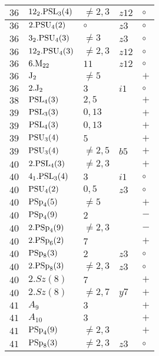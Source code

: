 \documentclass[a4paper, 11pt]{article}
\begin{document}
\begin{longtable}{lllll}
		$36$ & $12_2.{\rm PSL}_{3}(4)$ & $\neq 2,3$ & $z12$ & $\circ$ \\ \hline
		$36$ & $2.{\rm PSU}_{4}(2)$ & $\circ$ & $z3$ & $\circ$ \\ \hline
		$36$ & $3_2.{\rm PSU}_{4}(3)$ & $\neq 3$ & $z3$ & $\circ$ \\ \hline
		$36$ & $12_2.{\rm PSU}_{4}(3)$ & $\neq 2,3$ & $z12$ & $\circ$ \\ \hline
		$36$ & $6.{\rm M}_{22}$ & $11$ & $z12$ & $\circ$ \\ \hline
		$36$ & ${\rm J}_2$ & $\neq 5$ & & $+$ \\ \hline
		$36$ & $2.{\rm J}_2$ & $3$ & $i1$ & $\circ$ \\ \hline
		$38$ & ${\rm PSL}_{4}(3)$ & $2,5$ & & $+$ \\ \hline
		$39$ & ${\rm PSL}_{3}(3)$ & $0,13$ & & $+$ \\ \hline
		$39$ & ${\rm PSL}_{4}(3)$ & $0,13$ & & $+$ \\ \hline
		$39$ & ${\rm PSU}_{3}(4)$ & $5$ & & $+$ \\ \hline
		$39$ & ${\rm PSU}_{3}(4)$ & $\neq 2,5$ & $b5$ & $+$ \\ \hline
		$40$ & $2.{\rm PSL}_{4}(3)$ & $\neq 2,3$ & & $+$ \\ \hline
		$40$ & $4_1.{\rm PSL}_{3}(4)$ & $3$ & $i1$ & $\circ$ \\ \hline
		$40$ & ${\rm PSU}_{4}(2)$ & $0,5$ & $z3$ & $\circ$ \\ \hline
		$40$ & ${\rm PSp}_{4}(5)$ & $\neq 5$ & & $+$ \\ \hline
		$40$ & ${\rm PSp}_{4}(9)$ & $2$ & & $-$ \\ \hline
		$40$ & $2.{\rm PSp}_{4}(9)$ & $\neq 2,3$ & & $-$ \\ \hline
		$40$ & $2.{\rm PSp}_{6}(2)$ & $7$ & & $+$ \\ \hline
		$40$ & ${\rm PSp}_{8}(3)$ & $2$ & $z3$ & $\circ$ \\ \hline
		$40$ & $2.{\rm PSp}_{8}(3)$ & $\neq 2,3$ & $z3$ & $\circ$ \\ \hline
		$40$ & $2.Sz(8)$ & $7$ & & $+$ \\ \hline
		$40$ & $2.Sz(8)$ & $\neq 2,7$ & $y7$ & $+$ \\ \hline
		$41$ & $A_{9}$ & $3$ & & $+$ \\ \hline
		$41$ & $A_{10}$ & $3$ & & $+$ \\ \hline
		$41$ & ${\rm PSp}_{4}(9)$ & $\neq 2,3$ & & $+$ \\ \hline
		$41$ & ${\rm PSp}_{8}(3)$ & $\neq 2,3$ & $z3$ & $\circ$ \\ \hline

\end{longtable}
\end{document}
